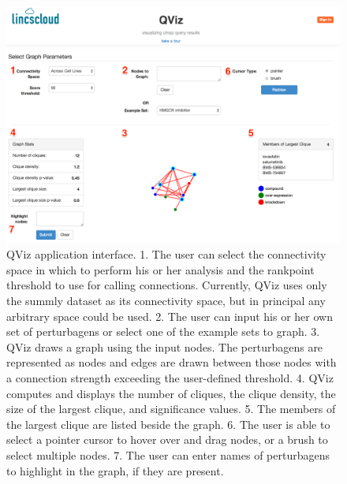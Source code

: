 \documentclass[12pt]{article}
\begin{document}
\begin{figure}[h]
\centering
\includegraphics[scale=0.5]{img/app_screenshot.png}
\caption{QViz application interface. 1. The user can select the connectivity space in which to perform his or her analysis and the rankpoint threshold to use for calling connections. Currently, QViz uses only the summly dataset as its connectivity space, but in principal any arbitrary space could be used. 2. The user can input his or her own set of perturbagens or select one of the example sets to graph. 3. QViz draws a graph using the input nodes.  The perturbagens are represented as nodes and edges are drawn between those nodes with a connection strength exceeding the user-defined threshold. 4. QViz computes and displays the number of cliques, the clique density, the size of the largest clique, and significance values. 5. The members of the largest clique are listed beside the graph. 6. The user is able to select a pointer cursor to hover over and drag nodes, or a brush to select multiple nodes. 7. The user can enter names of perturbagens to highlight in the graph, if they are present.}
\label{fig:app_screenshot}
\end{figure}
\end{document}

